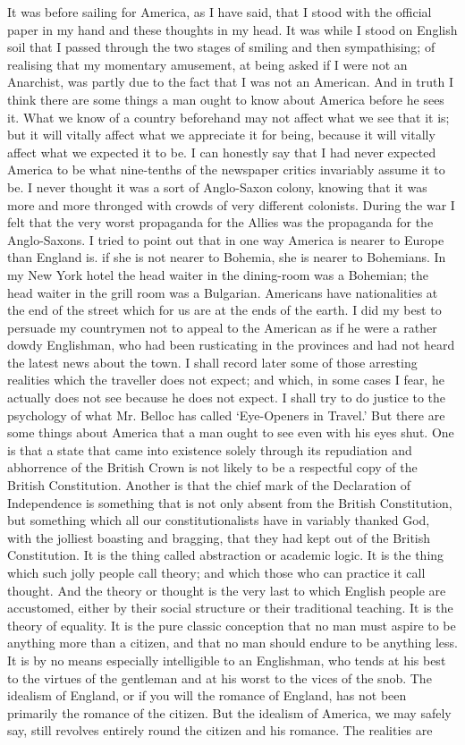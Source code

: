\documentclass{book}
\begin{document}
It was before sailing for America, as I have said, that I stood with the official paper in my hand and these thoughts in my head. It was while I stood on English soil that I passed through the two stages of smiling and then sympathising; of realising that my momentary amusement, at being asked if I were not an Anarchist, was partly due to the fact that I was not an American. And in truth I think there are some things a man ought to know about America before he sees it. What we know of a country beforehand may not affect what we see that it is; but it will vitally affect what we appreciate it for being, because it will vitally affect what we expected it to be. I can honestly say that I had never expected America to be what nine-tenths of the newspaper critics invariably assume it to be. I never thought it was a sort of Anglo-Saxon colony, knowing that it was more and more thronged with crowds of very different colonists. During the war I felt that the very worst propaganda for the Allies was the propaganda for the Anglo-Saxons. I tried to point out that in one way America is nearer to Europe than England is. if she is not nearer to Bohemia, she is nearer to Bohemians. In my New York hotel the head waiter in the dining-room was a Bohemian; the head waiter in the grill room was a Bulgarian. Americans have nationalities at the end of the street which for us are at the ends of the earth. I did my best to persuade my countrymen not to appeal to the American as if he were a rather dowdy Englishman, who had been rusticating in the provinces and had not heard the latest news about the town. I shall record later some of those arresting realities which the traveller does not expect; and which, in some cases I fear, he actually does not see because he does not expect. I shall try to do justice to the psychology of what Mr. Belloc has called ‘Eye-Openers in Travel.’ But there are some things about America that a man ought to see even with his eyes shut. One is that a state that came into existence solely through its repudiation and abhorrence of the British Crown is not likely to be a respectful copy of the British Constitution. Another is that the chief mark of the Declaration of Independence is something that is not only absent from the British Constitution, but something which all our constitutionalists have in variably thanked God, with the jolliest boasting and bragging, that they had kept out of the British Constitution. It is the thing called abstraction or academic logic. It is the thing which such jolly people call theory; and which those who can practice it call thought. And the theory or thought is the very last to which English people are accustomed, either by their social structure or their traditional teaching. It is the theory of equality. It is the pure classic conception that no man must aspire to be anything more than a citizen, and that no man should endure to be anything less. It is by no means especially intelligible to an Englishman, who tends at his best to the virtues of the gentleman and at his worst to the vices of the snob. The idealism of England, or if you will the romance of England, has not been primarily the romance of the citizen. But the idealism of America, we may safely say, still revolves entirely round the citizen and his romance. The realities are 
\end{document}
